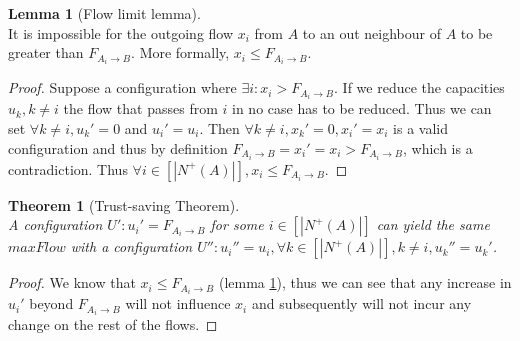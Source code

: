 \documentclass[11pt]{article}
\newtheorem{theorem}{Theorem}[section]
\theoremstyle{definition}
\theoremstyle{corollary}
\newtheorem{corollary}{Corollary}[section]
\theoremstyle{lemma}
\newtheorem{lemma}{Lemma}[section]
\begin{document}

    \begin{lemma}[Flow limit lemma] \ \\
       \label{flowlimit}
       It is impossible for the outgoing flow $x_i$ from $A$ to an out neighbour of $A$ to be greater than
       $F_{A_i \rightarrow B}$. More formally, $x_i \leq F_{A_i \rightarrow B}$.
    \end{lemma}
    \begin{proof}
       Suppose a configuration where $\exists i : x_i > F_{A_i \rightarrow B}$. If we reduce the capacities $u_k, k \neq i$
       the flow that passes from $i$ in no case has to be reduced. Thus we can set $\forall k \neq i, u_k' = 0$ and $u_i' =
       u_i$. Then $\forall k \neq i,x_k' = 0, x_i' = x_i$ is a valid configuration and thus by definition $F_{A_i \rightarrow
       B} = x_i' = x_i > F_{A_i \rightarrow B}$, which is a contradiction. Thus $\forall i \in [|N^{+}(A)|], x_i \leq
       F_{A_i \rightarrow B}$.
    \end{proof}

    \begin{theorem}[Trust-saving Theorem] \ \\
       \label{trustsave}
       A configuration $U' : u_i' = F_{A_i \rightarrow B}$ for some $i \in [|N^{+}(A)|]$ can yield the same $maxFlow$ with a
       configuration $U'' : u_i'' = u_i, \forall k \in [|N^{+}(A)|], k \neq i, u_k'' = u_k'$.
    \end{theorem}
    \begin{proof}
       We know that $x_i \leq F_{A_i \rightarrow B}$ (lemma \ref{flowlimit}), thus we can see that any increase in $u_i'$
       beyond $F_{A_i \rightarrow B}$ will not influence $x_i$ and subsequently will not incur any change on the rest of the
       flows.
    \end{proof}
\end{document}

